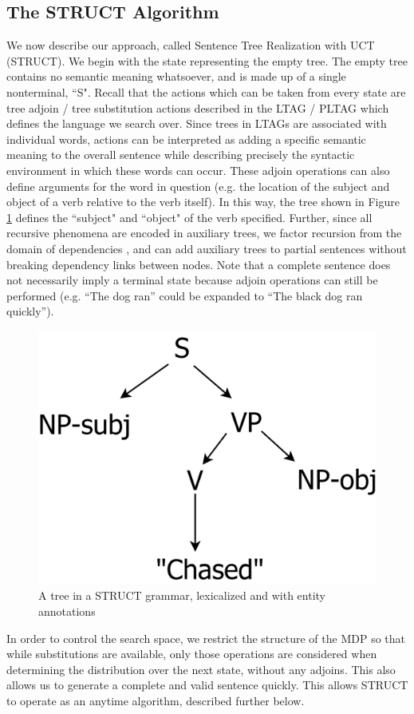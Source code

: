 \subsection{The STRUCT Algorithm}
We now describe our approach, called Sentence Tree Realization with
UCT (STRUCT).
We begin with the state representing the empty tree.  The empty tree
contains no semantic meaning whatsoever, and is made up of a single
nonterminal, ``S".  Recall that the actions which can be taken from
every state are tree adjoin / tree substitution actions described in the
LTAG / PLTAG which defines the language we search over.
Since trees in LTAGs are associated
with individual words, actions can be interpreted as adding a specific
semantic meaning to the overall sentence while describing precisely
the syntactic environment in which these words can occur.
These adjoin operations can also
define arguments for the word in question (e.g. the
location of the subject and object of a verb relative to the verb itself).
In this way, the tree shown in Figure \ref{s-to-npvp} defines the
``subject" and ``object" of the verb specified.
Further, since all recursive phenomena are
encoded in auxiliary trees, we factor recursion from the domain of
dependencies \cite{bauer2009statistical}, and can add auxiliary trees
to partial sentences without breaking dependency links between nodes.
Note that a complete sentence does not necessarily imply
a terminal state because adjoin operations can still be performed
(e.g. ``The dog ran'' could be expanded to ``The black dog ran quickly'').

\begin{figure}
\centering
\includegraphics[width=.4\linewidth]{s-vpnp.png}
\caption{A tree in a STRUCT grammar, lexicalized and with entity annotations}
\label{s-to-npvp}
\end{figure}

In order to control the search space, we restrict the structure of the
MDP so that while substitutions are available, only those operations
are considered when determining the distribution over the next state,
without any adjoins.  This also allows us to generate a
complete and valid sentence quickly.  This allows STRUCT to operate as
an anytime algorithm, described further below.

